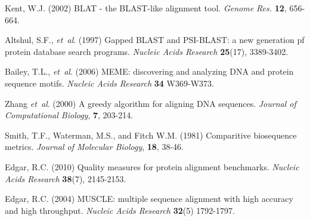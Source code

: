 \documentclass[phd,tocprelim]{cornell}
\begin{document}
\begin{thebibliography}{}
Kent, W.J. (2002) BLAT - the BLAST-like alignment tool. \textit{Genome Res.} \textbf{12}, 656-664.

Altshul, S.F., \textit{et~al}. (1997) Gapped BLAST and PSI-BLAST: a new generation pf protein database search programs. \textit{Nucleic Acids Research} \textbf{25}(17), 3389-3402.

Bailey, T.L., \textit{et~al}. (2006) MEME: discovering and analyzing DNA and protein sequence motifs. \textit{Nucleic Acids Research} \textbf{34} W369-W373.

Zhang \textit{et~al}. (2000) A greedy algorithm for aligning DNA sequences. \textit{Journal of Computational Biology}, \textbf{7}, 203-214.

Smith, T.F., Waterman, M.S., and Fitch W.M. (1981) Comparitive biosequence metrics. \textit{Journal of Molecular Biology}, \textbf{18}, 38-46.

Edgar, R.C. (2010) Quality measures for protein alignment benchmarks. \textit{Nucleic Acids Research} \textbf{38}(7), 2145-2153.

Edgar, R.C. (2004) MUSCLE: multiple sequence alignment with high accuracy and high throughput. \textit{Nucleic Acids Research} \textbf{32}(5) 1792-1797.

\end{thebibliography}
\end{document}
